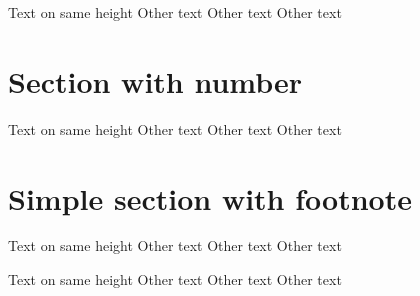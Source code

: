 \documentclass{kapital}
\begin{document}
  \tableofcontents*
  \mainmatter


  Text on same height
  \clearpage
  Other text
    \clearpage
  Other text
    \clearpage
  Other text

  \section{Section with number}

  Text on same height
  \clearpage
  Other text
    \clearpage
  Other text
    \clearpage
  Other text


  \section[Simple section with footnote]{Simple section with footnote\footnotemark}

  Text on same height
  \clearpage
  Other text
    \clearpage
  Other text
    \clearpage
  Other text

  

  Text on same height
  \clearpage
  Other text
    \clearpage
  Other text
    \clearpage
  Other text








\end{document}
